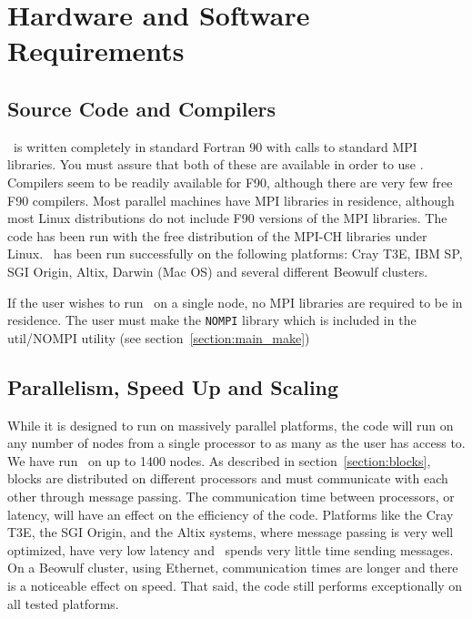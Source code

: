 \section{Hardware and Software Requirements \label{section:requirements}}

\subsection{Source Code and Compilers \label{section:compiler}}

\BATSRUS\ is written completely in standard Fortran 90 with calls to
standard MPI libraries.  You must assure that both of these are available
in order to
use \BATSRUS.  Compilers seem to be readily available for
F90, although there are very few free F90 compilers.  Most parallel
machines have MPI libraries in residence, although most Linux
distributions do not include F90 versions of the MPI libraries.  The
code has been run with the free distribution of the MPI-CH libraries
under Linux. \BATSRUS\ has been run successfully on the following platforms:
Cray T3E, IBM SP, SGI Origin, Altix, Darwin (Mac OS) and several
different Beowulf clusters.

If the user wishes to run \BATSRUS\ on a single node, no MPI libraries
are required to be in residence.  The user must make the {\tt NOMPI}
library which is included in the util/NOMPI utility
(see section~\ref{section:main_make})

\subsection{Parallelism, Speed Up and Scaling \label{scaling}}

While it is designed to run on massively parallel platforms, the
code will run on any number of nodes from a single processor to as
many as the user has access to. We have run \BATSRUS\ on up
to 1400 nodes.  As described in section~\ref{section:blocks},
blocks are distributed on different
processors and must communicate with each other through message passing.
The communication time between processors, or latency, will have an 
effect on the efficiency of the code.  Platforms like the Cray T3E, 
the SGI Origin, and the Altix systems,
where message passing is very well optimized, have very low latency and
\BATSRUS\ spends very little time sending messages.  On a Beowulf cluster,
using Ethernet, communication times are longer and there is a noticeable
effect on speed.  That said, the code still performs exceptionally on
all tested platforms.

